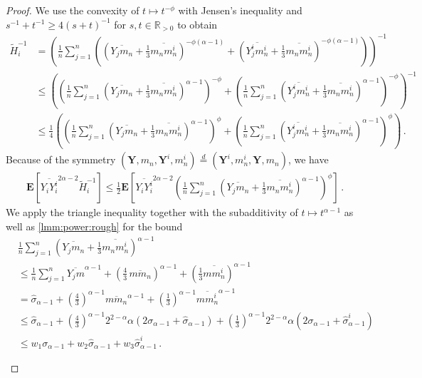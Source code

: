 \documentclass{article}
\newcommand*{\mo}[1]{\mathbf{#1}}
\newcommand{\R}{\mathbb{R}}
\newcommand{\Rpp}{\R_{>0}}
\newcommand{\lab}{\left[} %
\newcommand{\rab}{\right]} %
\newcommand{\ab}[1]{\lab #1 \rab} %
\newcommand{\abOf}[1]{\!\ab{#1}} %
\newcommand{\lb}{\left(} %
\newcommand{\rb}{\right)} %
\newcommand{\br}[1]{\lb #1 \rb} %
\newcommand{\E}{\mathbf{E}} %
\newcommand{\EOf}[1]{\E\abOf{#1}}
\newcommand{\eqfs}{\,.}
\newcommand{\ol}[2]{\overline{#1#2}}
\begin{document}
\begin{proof}
    We use the convexity of $t\mapsto t^{-\phi}$ with Jensen's inequality and $s^{-1} + t^{-1} \geq 4(s+t)^{-1}$ for $s,t\in\Rpp$ to obtain
	\begin{align}
		\tilde H_i^{-1}
		&=
		\br{\frac1n \sum_{j=1}^n \br{(\ol{Y_j}{m_n} + \frac13\ol{m_n}{m_n^i})^{-\phi(\alpha-1)} + (\ol{Y_j^i}{m_n^i} + \frac13\ol{m_n}{m_n^i})^{-\phi(\alpha-1)}}}^{-1}
		\\&\leq
		\br{\br{\frac1n \sum_{j=1}^n (\ol{Y_j}{m_n} + \frac13\ol{m_n}{m_n^i})^{\alpha-1}}^{-\phi} + \br{\frac1n \sum_{j=1}^n (\ol{Y_j^i}{m_n^i} + \frac13\ol{m_n}{m_n^i})^{\alpha-1}}^{-\phi}}^{-1}
		\\&\leq
		\frac14\br{\br{\frac1n \sum_{j=1}^n (\ol{Y_j}{m_n} + \frac13\ol{m_n}{m_n^i})^{\alpha-1}}^{\phi} + \br{\frac1n \sum_{j=1}^n (\ol{Y_j^i}{m_n^i} + \frac13\ol{m_n}{m_n^i})^{\alpha-1}}^{\phi}}
        \eqfs
	\end{align}
	Because of the symmetry $(\mo Y, m_n, \mo Y^i, m_n^i) \stackrel{d}{=} (\mo Y^i, m_n^i, \mo Y, m_n)$, we have
	\begin{align}
		\EOf{
			\ol {Y_i}{Y_i^i}^{2\alpha-2}
			\tilde H_i^{-1}
		}
		\leq 
		\frac12\EOf{
			\ol {Y_i}{Y_i^i}^{2\alpha-2}
			\br{\frac1n \sum_{j=1}^n (\ol{Y_j}{m_n} + \frac13\ol{m_n}{m_n^i})^{\alpha-1}}^{\phi}
		}
        \eqfs
	\end{align}
    We apply the triangle inequality together with the subadditivity of $t \mapsto t^{\alpha-1}$ as well as \cref{lmm:power:rough} for the bound 
	\begin{align}
		&\frac1n \sum_{j=1}^n (\ol{Y_j}{m_n} + \frac13\ol{m_n}{m_n^i})^{\alpha-1}
		\\&\leq
		\frac1n \sum_{j=1}^n \ol{Y_j}{m}^{\alpha-1} + \br{\frac43\, \ol{m}{m_n}}^{\alpha-1} + \br{\frac13\ol{m}{m_n^i}}^{\alpha-1}
		\\&=
		\hat\sigma_{\alpha-1} + \br{\frac43}^{\alpha-1} \ol{m}{m_n}^{\alpha-1} + \br{\frac13}^{\alpha-1}\ol{m}{m_n^i}^{\alpha-1}
		\\&\leq
		\hat\sigma_{\alpha-1} +\br{\frac43}^{\alpha-1} 2^{2-\alpha} \alpha \br{
				2 \sigma_{\alpha-1} + \hat \sigma_{\alpha-1}
			} + \br{\frac13}^{\alpha-1} 2^{2-\alpha} \alpha \br{
				2 \sigma_{\alpha-1} + \hat \sigma^i_{\alpha-1}
		}
		\\&\leq
		w_1 \sigma_{\alpha-1}
		+
		w_2 \hat\sigma_{\alpha-1}
		+
		w_3 \hat\sigma^i_{\alpha-1}
		\eqfs
	\end{align}
	\begin{enumerate}[label=(\roman*)]

\end{enumerate}
\end{proof}
\end{document}
